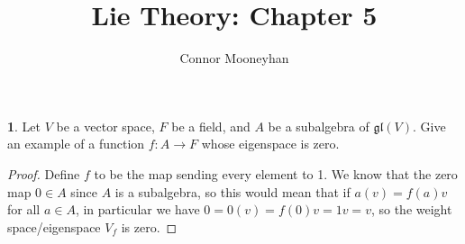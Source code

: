 \documentclass[12pt]{article}
\title{Lie Theory: Chapter 5}
\author{Connor Mooneyhan}
\date{}
\newcommand{\gl}{\mathfrak{gl}}
\theoremstyle{definition}
\newtheorem{ex}{}
\begin{document}
\maketitle

\begin{ex}
	Let $V$ be a vector space, $F$ be a field, and $A$ be a subalgebra of $\gl(V)$.
	Give an example of a function $f : A \to F$ whose eigenspace is zero.
\end{ex}
\begin{proof}
	Define $f$ to be the map sending every element to 1.
	We know that the zero map $0 \in A$ since $A$ is a subalgebra, so this would mean that if $a(v) = f(a)v$ for all $a \in A$, in particular we have $0 = 0(v) = f(0)v = 1v = v$, so the weight space/eigenspace $V_f$ is zero.
\end{proof}
\end{document}
